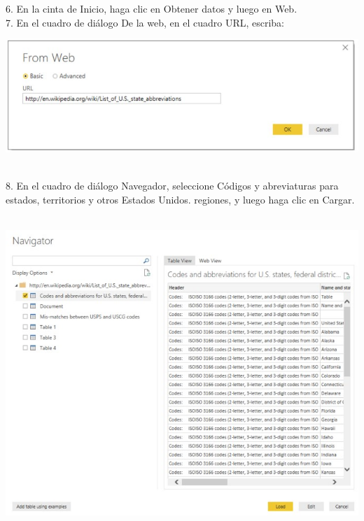 \begin{flushleft}
\begin{itemize}
\textbf{ }\\
\textbf{ }\\
6. En la cinta de Inicio, haga clic en Obtener datos y luego en Web.\\
7. En el cuadro de diálogo De la web, en el cuadro URL, escriba:\\
\begin{center}
	\includegraphics[width=16cm]{./Imagenes/image28} 
	\end{center}
\textbf{ }\\

8. En el cuadro de diálogo Navegador, seleccione Códigos y abreviaturas para estados, territorios y otros Estados Unidos.
regiones, y luego haga clic en Cargar.\\

\textbf{ }\\
\begin{center}
	\includegraphics[width=15cm]{./Imagenes/image29} 
	\end{center}
\textbf{ }\\


\end{itemize}
\end{flushleft}

